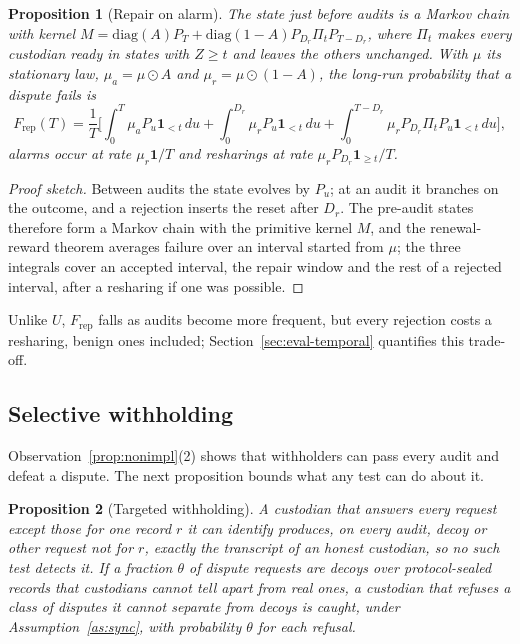 \documentclass[Crown,sagev]{sagej}
\theoremstyle{plain}
\newtheorem{proposition}{Proposition}
\theoremstyle{definition}
\theoremstyle{remark}
\begin{document}
\begin{proposition}[Repair on alarm]\label{prop:repair}
The state just before audits is a Markov chain with kernel $M=\mathrm{diag}(A)P_T+\mathrm{diag}(1-A)P_{D_r}\Pi_t P_{T-D_r}$, where $\Pi_t$ makes every custodian ready in states with $Z\ge t$ and leaves the others unchanged. With $\mu$ its stationary law, $\mu_a=\mu\odot A$ and $\mu_r=\mu\odot(1-A)$, the long-run probability that a dispute fails is
\[
F_{\mathrm{rep}}(T)=\frac1T\Big[\int_0^T\!\mu_aP_u\mathbf{1}_{<t}\,du+\int_0^{D_r}\!\mu_rP_u\mathbf{1}_{<t}\,du+\int_0^{T-D_r}\!\mu_rP_{D_r}\Pi_t P_u\mathbf{1}_{<t}\,du\Big],
\]
alarms occur at rate $\mu_r\mathbf{1}/T$ and resharings at rate $\mu_rP_{D_r}\mathbf{1}_{\ge t}/T$.
\end{proposition}

\begin{proof}[Proof sketch]
Between audits the state evolves by $P_u$; at an audit it branches on the outcome, and a rejection inserts the reset after $D_r$. The pre-audit states therefore form a Markov chain with the primitive kernel $M$, and the renewal-reward theorem averages failure over an interval started from $\mu$; the three integrals cover an accepted interval, the repair window and the rest of a rejected interval, after a resharing if one was possible.
\end{proof}

Unlike $U$, $F_{\mathrm{rep}}$ falls as audits become more frequent, but every rejection costs a resharing, benign ones included; Section~\ref{sec:eval-temporal} quantifies this trade-off.

\subsection{Selective withholding}\label{sec:withhold}

Observation~\ref{prop:nonimpl}(2) shows that withholders can pass every audit and defeat a dispute. The next proposition bounds what any test can do about it.

\begin{proposition}[Targeted withholding]\label{prop:withhold}
A custodian that answers every request except those for one record $r$ it can identify produces, on every audit, decoy or other request not for $r$, exactly the transcript of an honest custodian, so no such test detects it. If a fraction $\theta$ of dispute requests are decoys over protocol-sealed records that custodians cannot tell apart from real ones, a custodian that refuses a class of disputes it cannot separate from decoys is caught, under Assumption~\ref{as:sync}, with probability $\theta$ for each refusal.
\end{proposition}
\end{document}
